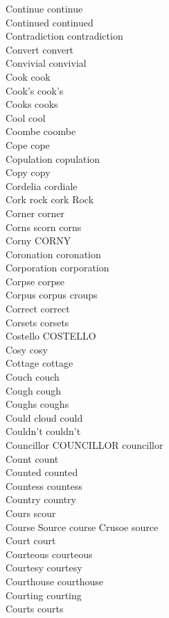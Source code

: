 Continue continue\\
Continued continued\\
Contradiction contradiction\\
Convert convert\\
Convivial convivial\\
Cook cook\\
Cook's cook's\\
Cooks cooks\\
Cool cool\\
Coombe coombe\\
Cope cope\\
Copulation copulation\\
Copy copy\\
Cordelia cordiale\\
Cork rock cork Rock\\
Corner corner\\
Corns scorn corns\\
Corny CORNY\\
Coronation coronation\\
Corporation corporation\\
Corpse corpse\\
Corpus corpus croups\\
Correct correct\\
Corsets corsets\\
Costello COSTELLO\\
Cosy cosy\\
Cottage cottage\\
Couch couch\\
Cough cough\\
Coughs coughs\\
Could cloud could\\
Couldn't couldn't\\
Councillor COUNCILLOR councillor\\
Count count\\
Counted counted\\
Countess countess\\
Country country\\
Cours scour\\
Course Source course Crusoe source\\
Court court\\
Courteous courteous\\
Courtesy courtesy\\
Courthouse courthouse\\
Courting courting\\
Courts courts\\
